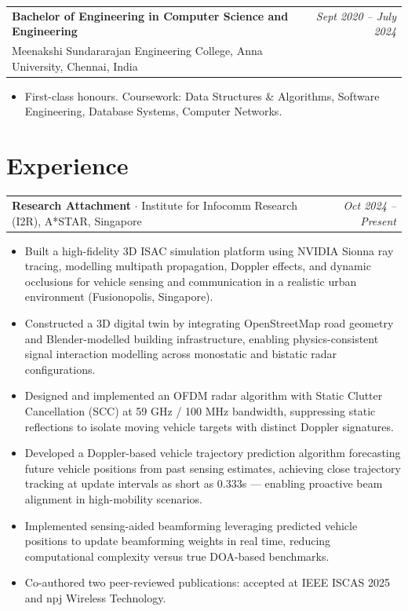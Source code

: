 \documentclass[10pt, a4paper]{article}
\makeatletter
\newcommand{\jobentry}[3]{%
    \noindent
    \begin{tabularx}{\textwidth}{@{}X r@{}}
        \textbf{#1} $\cdot$ #2 & \textit{#3}
    \end{tabularx}%
    \vspace{1pt}%
}
\newcommand{\eduentry}[3]{%
    \noindent
    \begin{tabularx}{\textwidth}{@{}X r@{}}
        \textbf{#1} & \textit{#3} \\
        #2 &
    \end{tabularx}%
    \vspace{1pt}%
}
\newcommand{\entryspace}{\vspace{6pt}}
\newcommand{\sectionspace}{\vspace{2pt}}
\makeatother
\begin{document}
\entryspace

\eduentry{Bachelor of Engineering in Computer Science and Engineering}{Meenakshi Sundararajan Engineering College, Anna University, Chennai, India}{Sept 2020 -- July 2024}
\begin{itemize}
    \item First-class honours. Coursework: Data Structures \& Algorithms, Software Engineering, Database Systems, Computer Networks.
\end{itemize}

\entryspace

\section{Experience}
\sectionspace

\jobentry{Research Attachment}{Institute for Infocomm Research (I2R), A*STAR, Singapore}{Oct 2024 -- Present}
\begin{itemize}
    \item Built a high-fidelity 3D ISAC simulation platform using NVIDIA Sionna ray tracing, modelling multipath propagation, Doppler effects, and dynamic occlusions for vehicle sensing and communication in a realistic urban environment (Fusionopolis, Singapore).
    \item Constructed a 3D digital twin by integrating OpenStreetMap road geometry and Blender-modelled building infrastructure, enabling physics-consistent signal interaction modelling across monostatic and bistatic radar configurations.
    \item Designed and implemented an OFDM radar algorithm with Static Clutter Cancellation (SCC) at 59 GHz / 100 MHz bandwidth, suppressing static reflections to isolate moving vehicle targets with distinct Doppler signatures.
    \item Developed a Doppler-based vehicle trajectory prediction algorithm forecasting future vehicle positions from past sensing estimates, achieving close trajectory tracking at update intervals as short as 0.333s --- enabling proactive beam alignment in high-mobility scenarios.
    \item Implemented sensing-aided beamforming leveraging predicted vehicle positions to update beamforming weights in real time, reducing computational complexity versus true DOA-based benchmarks.
    \item Co-authored two peer-reviewed publications: accepted at IEEE ISCAS 2025 and npj Wireless Technology.
\end{itemize}
\end{document}
